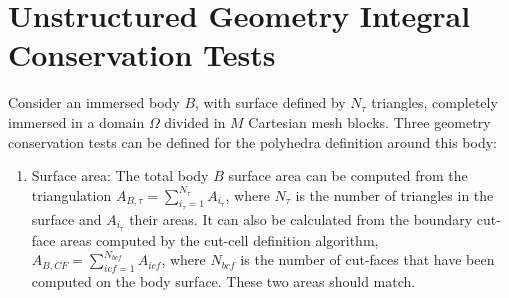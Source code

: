 \documentclass[11pt]{book}
\begin{document}
\normalsize


\ifcompgeom

\chapter{Unstructured Geometry Integral Conservation Tests}
\label{info:constests}

Consider an immersed body $B$, with surface defined by $N_\tau$ triangles, completely immersed in a domain $\Omega$ divided in $M$ Cartesian mesh blocks.
Three geometry conservation tests can be defined for the polyhedra definition around this body:
%
\begin{enumerate}

    \item Surface area:
    The total body $B$ surface area can be computed from the triangulation $A_{B,\tau}=\sum_{i_\tau=1}^{N_\tau}{A_{i_\tau}}$, where $N_\tau$ is the number of triangles in the surface and $A_{i_\tau}$ their areas. It can also be calculated from the boundary cut-face areas computed by the cut-cell definition algorithm,  $A_{B,CF}=\sum_{icf=1}^{N_{bcf}}{A_{icf}}$, where $N_{bcf}$ is the number of cut-faces that have been computed on the body surface. These two areas should match.
    \newline


\end{enumerate}
\end{document}
